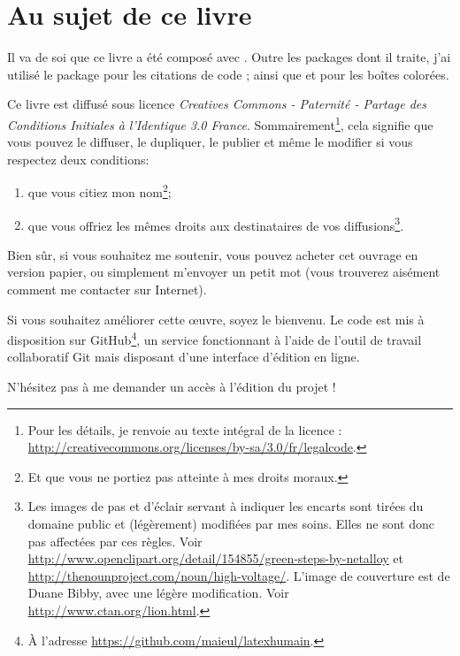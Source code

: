 \section*{Au sujet de ce livre}\thispagestyle{plain}

Il va de soi que ce livre a été composé avec \XeLaTeX. Outre les packages dont il traite, j'ai utilisé le package   pour les citations de code ; ainsi que  et  pour les boîtes colorées.



Ce livre est diffusé sous licence \emph{Creatives Commons - Paternité - Partage des Conditions Initiales à l'Identique 3.0 France}. Sommairement\footnote{Pour les détails, je renvoie au texte intégral de la licence : \url{http://creativecommons.org/licenses/by-sa/3.0/fr/legalcode}.}, cela signifie que vous pouvez le diffuser, le dupliquer, le publier et même le modifier si vous respectez deux conditions:
\begin{enumerate}
\item que vous citiez mon nom\footnote{Et que vous ne portiez  pas atteinte à mes droits moraux.};
\item que vous offriez les mêmes droits aux destinataires de vos diffusions\footnote{Les images de pas et d'éclair servant à indiquer les encarts sont tirées du domaine public et (légèrement) modifiées par mes soins. Elles ne sont donc pas affectées par ces règles. Voir \url{http://www.openclipart.org/detail/154855/green-steps-by-netalloy} et \url{http://thenounproject.com/noun/high-voltage/}. L'image de couverture est de Duane  Bibby, avec une légère modification. Voir \url{http://www.ctan.org/lion.html}.}.
\end{enumerate}

Bien sûr, si vous souhaitez me soutenir, vous pouvez acheter cet ouvrage en version papier, ou simplement m'envoyer un petit mot (vous trouverez aisément comment me contacter sur Internet).

Si vous souhaitez améliorer cette œuvre, soyez le bienvenu. Le code est mis à disposition sur GitHub\footnote{À l'adresse \url{https://github.com/maieul/latexhumain}.}, un service fonctionnant à l'aide de l'outil de travail collaboratif Git mais disposant d'une interface d'édition en ligne. 

N'hésitez pas à me demander un accès à l'édition du projet ! 

